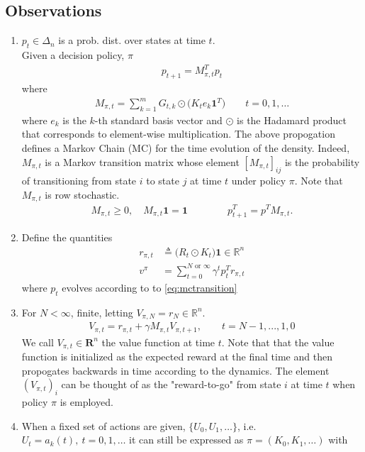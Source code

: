 \documentclass[]{article}
\newcommand{\mbf}{\mathbf}
\newcommand{\mb}{\mathbb}
\begin{document}
\subsection*{Observations}
\begin{enumerate}
\item $p_t \in \Delta_n$ is a prob. dist. over states at time $t$. \\
Given a  decision policy, $\pi$
\begin{align}
p_{t+1} = M_{\pi,t}^T p_t
\end{align}
where 
\begin{align}
M_{\pi,t} = \sum_{k=1}^m G_{t,k} \odot \big(K_t e_k \mbf{1}^T\big) \qquad t=0,1,\dots
\end{align}
where $e_k$ is the $k$-th standard basis vector and $\odot$ is the Hadamard product that corresponds to element-wise multiplication.  
The above propogation defines a Markov Chain (MC) for the time evolution of the density.   Indeed, $M_{\pi,t}$ is a Markov transition matrix whose element $[M_{\pi,t}]_{ij}$ is the probability of transitioning from state $i$ to state $j$ at time $t$ under policy $\pi$.  Note that $M_{\pi,t}$ is row stochastic.  
\begin{align}
M_{\pi,t} \geq 0, \quad M_{\pi,t}\mbf{1} = \mbf{1} \qquad \qquad p_{t+1}^T = p^T M_{\pi,t}. \label{eq:mctransition}
\end{align}
\item Define the quantities
\begin{align}
r_{\pi,t} & \triangleq \big(R_t \odot K_t \big) \mbf{1} \in \mb{R}^n \\
v^\pi & = \sum_{t=0}^{N \text{ or } \infty} \gamma^t p_t^T r_{\pi,t}
\end{align}
where $p_t$ evolves according to to \eqref{eq:mctransition}
\item For $N<\infty$, finite, letting $V_{\pi,N} = r_N \in \mb{R}^n$. 
\begin{align}
V_{\pi,t} = r_{\pi,t} + \gamma M_{\pi,t} V_{\pi,t+1}, \qquad t = N-1,...,1,0
\end{align} 
We call $V_{\pi,t} \in \mbf{R}^n$ the value function at time $t$.  Note that that the value function is initialized as the expected reward at the final time and then propogates backwards in time according to the dynamics.  The element $(V_{\pi,t})_i$ can be thought of as the "reward-to-go" from state $i$ at time $t$ when policy $\pi$ is employed.  
\item When a fixed set of actions are given, $\{U_0,U_1, \dots \}$, i.e. $U_t = a_k(t), \ t = 0,1, \dots$ it can still be expressed as $\pi = (K_0,K_1,\dots)$ with

\end{enumerate}
\end{document}
